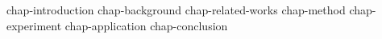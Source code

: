 % 
% 
% 
% 
% 
% 
% 

{chap-introduction}
{chap-background}
{chap-related-works}
{chap-method}
{chap-experiment}
{chap-application}
{chap-conclusion}
% 
% 
% 
% 
% 
% 
